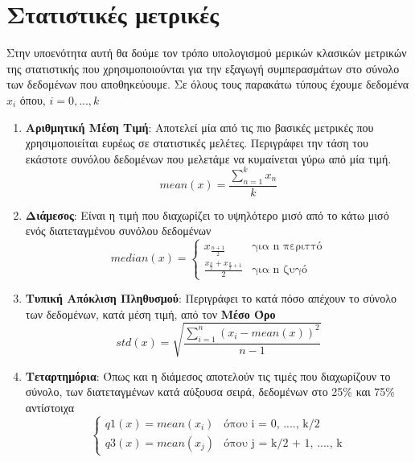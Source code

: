 \break
\section{Στατιστικές μετρικές}
\label{section:statistics}

Στην υποενότητα αυτή θα δούμε τον τρόπο υπολογισμού μερικών κλασικών μετρικών της στατιστικής
που χρησιμοποιούνται για την εξαγωγή συμπερασμάτων στο σύνολο των δεδομένων που αποθηκεύουμε.
Σε όλους τους παρακάτω τύπους έχουμε δεδομένα $x_i$ όπου, $i = 0, ..., k$

\begin{enumerate}
	\item \textbf{Αριθμητική Μέση Τιμή}: Αποτελεί μία από τις πιο βασικές μετρικές που χρησιμοποιείται ευρέως σε στατιστικές μελέτες.
		Περιγράφει την τάση του εκάστοτε συνόλου δεδομένων που μελετάμε να κυμαίνεται γύρω από μία τιμή.
	      \begin{equation}
		      mean(x) = \frac{\sum_{n = 1}^{k} x_n}{k}
	      \end{equation}
	\item \textbf{Διάμεσος}: Είναι η τιμή που διαχωρίζει το υψηλότερο μισό από το κάτω μισό ενός διατεταγμένου συνόλου δεδομένων 
	      \begin{equation}
		      median(x) =
		      \begin{cases}
			      x_{\frac{n + 1}{2}}                             & \text{για n περιττό}
			      \\[10pt]
			      \frac{x_{\frac{n}{2}} + x_{\frac{n}{2} + 1}}{2} & \text{για n ζυγό}
		      \end{cases}
	      \end{equation}
	\item \textbf{Τυπική Απόκλιση Πληθυσμού}: Περιγράφει το κατά πόσο απέχουν το σύνολο των δεδομένων, κατά μέση τιμή, από τον \textbf{Μέσο Όρο}
	      \begin{equation}
		      std(x) = \sqrt{\frac{\sum_{i = 1}^{n} (x_i - mean(x))^2}{n - 1}}
	      \end{equation}
	\item \textbf{Τεταρτημόρια}: Όπως και η διάμεσος αποτελούν τις τιμές που διαχωρίζουν το σύνολο, των
		  διατεταγμένων κατά αύξουσα σειρά, δεδομένων στο 25\% και 75\% αντίστοιχα  
	      \begin{equation}
				\begin{cases}
					q1(x) = mean(x_i) & \text{όπου i = 0, ...., k/2} \\
					q3(x) = mean(x_j) & \text{όπου j = k/2 + 1, ...., k}
				\end{cases}
	      \end{equation}
\end{enumerate}

\break